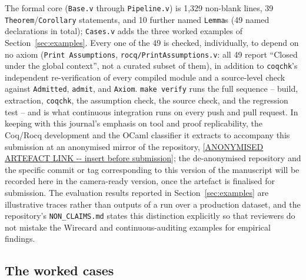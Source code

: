 \documentclass[smallcondensed,envcountsect,natbib]{svjour3}
\begin{document}
The formal core (\texttt{Base.v} through \texttt{Pipeline.v}) is 1{,}329 non-blank lines, 39 \texttt{Theorem}/\texttt{Corollary} statements, and 10 further named \texttt{Lemma}s (49 named declarations in total); \texttt{Cases.v} adds the three worked examples of Section~\ref{sec:examples}. Every one of the 49 is checked, individually, to depend on no axiom (\texttt{Print Assumptions}, \texttt{rocq/PrintAssumptions.v}: all 49 report ``Closed under the global context'', not a curated subset of them), in addition to \texttt{coqchk}'s independent re-verification of every compiled module and a source-level check against \texttt{Admitted}, \texttt{admit}, and \texttt{Axiom}. \texttt{make verify} runs the full sequence -- build, extraction, \texttt{coqchk}, the assumption check, the source check, and the regression test -- and is what continuous integration runs on every push and pull request. %
In keeping with this journal's emphasis on tool and proof replicability, the Coq/Rocq development and the OCaml classifier it extracts to accompany this submission at an anonymised mirror of the repository, \url{[ANONYMISED ARTEFACT LINK -- insert before submission]}; the de-anonymised repository and the specific commit or tag corresponding to this version of the manuscript will be recorded here in the camera-ready version, once the artefact is finalised for submission. The evaluation results reported in Section~\ref{sec:examples} are illustrative traces rather than outputs of a run over a production dataset, and the repository's \texttt{NON\_CLAIMS.md} states this distinction explicitly so that reviewers do not mistake the Wirecard and continuous-auditing examples for empirical findings.

\subsection*{The worked cases}
\end{document}
